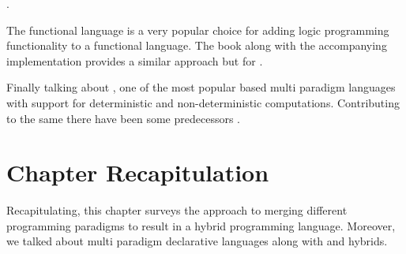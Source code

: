 \documentclass[thesis-solanki.tex]{subfiles}
\begin{document}
    .

The functional language  is a very popular choice for adding logic programming functionality to a functional 
language.
The book \cite{friedman05reasoned} along with the accompanying implementation \cite{website:kanren,website:minkanren} provides a similar 
approach but for  \cite{website:haskellkanren,website:molog,website:minikanrent}.

Finally talking about , one of the most popular  based multi paradigm languages
with support for deterministic and non-deterministic computations. Contributing to the same there have been some
predecessors \cite{website:alf,website:toy}.        


\section{Chapter Recapitulation}
Recapitulating, this chapter surveys the approach to merging different programming paradigms to result in a hybrid programming language. Moreover, we talked about multi paradigm declarative languages along with  and  hybrids.  


\ifMain
\begin{scope}
  \nolinenumbers
  \enotesize
  \par
  \begin{singlespace}
  \setlength{\parskip}{12pt plus 2pt minus 1pt}
  \theendnotes
  \par
  \end{singlespace}
\end{scope}
\fi
\end{document}
